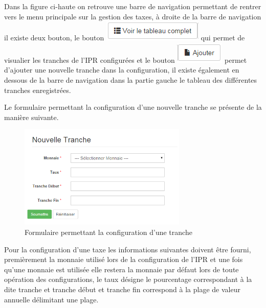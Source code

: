 \documentclass[12pt,a4paper]{report}
\begin{document}
Dans la figure ci-haute on retrouve une barre de navigation permettant de rentrer vers le menu principale sur la gestion des taxes, à droite de la barre de navigation il existe deux bouton, le bouton \includegraphics[scale=1]{pic/TabComplet.png} qui permet de visualier les tranches de l'IPR configurées et le bouton \includegraphics[scale=1]{pic/AddIPR.png} permet d'ajouter une nouvelle tranche dans la configuration, il existe également en dessous de la barre de navigation dans la partie gauche le tableau des différentes tranches enregistrées.

Le formulaire permettant la configuration d'une nouvelle tranche se présente de la manière suivante. 

\begin{figure}[h]
\begin{center}
\includegraphics[width=8cm]{pic/NouvTranche.png}
\end{center}
\caption{Formulaire permettant la configuration d'une tranche}
\label{Formulaire permettant la configuration d'une tranche}
\end{figure} 

Pour la configuration d'une taxe les informations suivantes doivent être fourni, premièrement la monnaie utilisé lors de la configuration de l'IPR et une fois qu'une monnaie est utilisée elle restera la monnaie par défaut lors de toute opération des configurations, le taux désigne le pourcentage correspondant à la dite tranche et tranche début et tranche fin correspond à la plage de valeur annuelle  délimitant une plage. 
\end{document}
